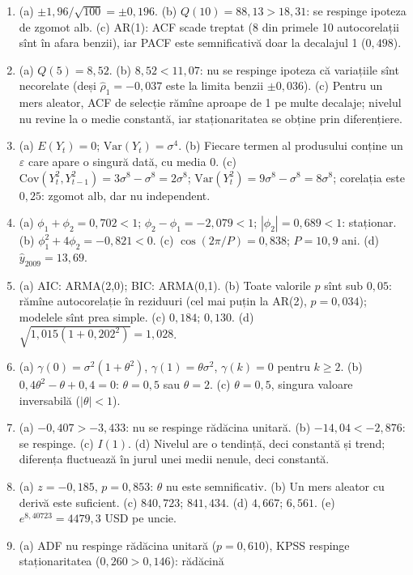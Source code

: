 \documentclass[10.5pt]{article}
\begin{document}
{\small
\begin{enumerate}[label=\textbf{\arabic*.},leftmargin=2.2em,itemsep=0.25ex]
\item (a) $\pm 1{,}96/\sqrt{100}=\pm 0{,}196$. (b) $Q(10)=88{,}13>18{,}31$: se respinge ipoteza de zgomot alb. (c) AR(1):
ACF scade treptat (8 din primele 10 autocorelații sînt în afara benzii), iar PACF este semnificativă doar la decalajul 1
($0{,}498$).
\item (a) $Q(5)=8{,}52$. (b) $8{,}52<11{,}07$: nu se respinge ipoteza că variațiile sînt necorelate (deși
$\hat\rho_1=-0{,}037$ este la limita benzii $\pm 0{,}036$). (c) Pentru un mers aleator, ACF de selecție rămîne aproape
de 1 pe multe decalaje; nivelul nu revine la o medie constantă, iar staționaritatea se obține prin diferențiere.
\item (a) $E(Y_t)=0$; $\mathrm{Var}(Y_t)=\sigma^4$. (b) Fiecare termen al produsului conține un $\varepsilon$ care
apare o singură dată, cu media 0. (c) $\mathrm{Cov}(Y_t^2,Y_{t-1}^2)=3\sigma^8-\sigma^8=2\sigma^8$;
$\mathrm{Var}(Y_t^2)=9\sigma^8-\sigma^8=8\sigma^8$; corelația este $0{,}25$: zgomot alb, dar nu independent.
\item (a) $\phi_1+\phi_2=0{,}702<1$; $\phi_2-\phi_1=-2{,}079<1$; $|\phi_2|=0{,}689<1$: staționar.
(b) $\phi_1^2+4\phi_2=-0{,}821<0$. (c) $\cos(2\pi/P)=0{,}838$; $P=10{,}9$ ani. (d) $\hat y_{2009}=13{,}69$.
\item (a) AIC: ARMA(2,0); BIC: ARMA(0,1). (b) Toate valorile $p$ sînt sub $0{,}05$: rămîne autocorelație în reziduuri
(cel mai puțin la AR(2), $p=0{,}034$); modelele sînt prea simple. (c) $0{,}184$; $0{,}130$. (d)
$\sqrt{1{,}015(1+0{,}202^2)}=1{,}028$.
\item (a) $\gamma(0)=\sigma^2(1+\theta^2)$, $\gamma(1)=\theta\sigma^2$, $\gamma(k)=0$ pentru $k\ge 2$.
(b) $0{,}4\theta^2-\theta+0{,}4=0$: $\theta=0{,}5$ sau $\theta=2$. (c) $\theta=0{,}5$, singura valoare inversabilă
($|\theta|<1$).
\item (a) $-0{,}407>-3{,}433$: nu se respinge rădăcina unitară. (b) $-14{,}04<-2{,}876$: se respinge. (c) $I(1)$.
(d) Nivelul are o tendință, deci constantă și trend; diferența fluctuează în jurul unei medii nenule, deci constantă.
\item (a) $z=-0{,}185$, $p=0{,}853$: $\theta$ nu este semnificativ. (b) Un mers aleator cu derivă este suficient. (c) $840{,}723$; $841{,}434$. (d) $4{,}667$; $6{,}561$. (e) $e^{8{,}40723}=4479{,}3$ USD pe uncie.
\item (a) ADF nu respinge rădăcina unitară ($p=0{,}610$), KPSS respinge staționaritatea ($0{,}260>0{,}146$): rădăcină

\end{enumerate}}
\end{document}
